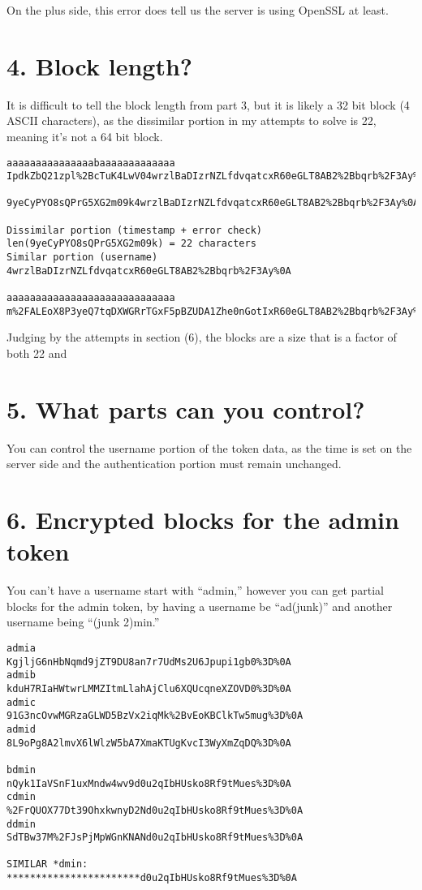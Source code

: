 \documentclass[12pt,letterpaper]{article}
\begin{document}
On the plus side, this error does tell us the server is using OpenSSL at least.

\section*{4. Block length?}
It is difficult to tell the block length from part 3, but it is likely
a 32 bit block (4 ASCII characters), as the dissimilar portion in my attempts
to solve is 22, meaning it's not a 64 bit block.

\begin{verbatim}
aaaaaaaaaaaaaaabaaaaaaaaaaaaa 
IpdkZbQ21zpl%2BcTuK4LwV04wrzlBaDIzrNZLfdvqatcxR60eGLT8AB2%2Bbqrb%2F3Ay%0A
 9yeCyPYO8sQPrG5XG2m09k4wrzlBaDIzrNZLfdvqatcxR60eGLT8AB2%2Bbqrb%2F3Ay%0A

Dissimilar portion (timestamp + error check)
len(9yeCyPYO8sQPrG5XG2m09k) = 22 characters
Similar portion (username)
4wrzlBaDIzrNZLfdvqatcxR60eGLT8AB2%2Bbqrb%2F3Ay%0A

aaaaaaaaaaaaaaaaaaaaaaaaaaaaa 
m%2FALEoX8P3yeQ7tqDXWGRrTGxF5pBZUDA1Zhe0nGotIxR60eGLT8AB2%2Bbqrb%2F3Ay%0A
\end{verbatim}

Judging by the attempts in section (6), the blocks are a size
that is a factor of both 22 and
\section*{5. What parts can you control?}
You can control the username portion of the token data, as the time
is set on the server side and the authentication portion must
remain unchanged.

\section*{6. Encrypted blocks for the admin token}
You can't have a username start with ``admin,'' however you can
get partial blocks for the admin token, by having a username be
``ad(junk)'' and another username being ``(junk 2)min.''

\begin{verbatim}
admia
KgjljG6nHbNqmd9jZT9DU8an7r7UdMs2U6Jpupi1gb0%3D%0A
admib
kduH7RIaHWtwrLMMZItmLlahAjClu6XQUcqneXZOVD0%3D%0A
admic
91G3ncOvwMGRzaGLWD5BzVx2iqMk%2BvEoKBClkTw5mug%3D%0A
admid
8L9oPg8A2lmvX6lWlzW5bA7XmaKTUgKvcI3WyXmZqDQ%3D%0A

bdmin
nQyk1IaVSnF1uxMndw4wv9d0u2qIbHUsko8Rf9tMues%3D%0A
cdmin
%2FrQUOX77Dt39OhxkwnyD2Nd0u2qIbHUsko8Rf9tMues%3D%0A
ddmin
SdTBw37M%2FJsPjMpWGnKNANd0u2qIbHUsko8Rf9tMues%3D%0A

SIMILAR *dmin:
***********************d0u2qIbHUsko8Rf9tMues%3D%0A
\end{verbatim}
\end{document}
